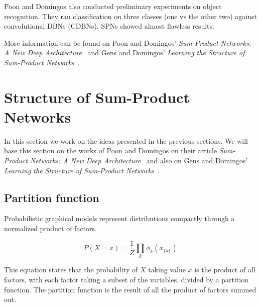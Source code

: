 \documentclass[a4paper,10pt]{article}
\theoremstyle{plain}
\begin{document}
Poon and Domingos also conducted preliminary experiments on object recognition. They ran
classification on three classes (one vs the other two) against convolutional DBNs (CDBNs). SPNs
showed almost flawless results.

\begin{table}[h]
\end{table}

More information can be found on Poon and Domingos' \textit{Sum-Product Networks: A New Deep
Architecture}~\cite{poon-domingos} and Gens and Domingos' \textit{Learning the Structure of
Sum-Product Networks}~\cite{gens-domingos}.

\newpage

\section{Structure of Sum-Product Networks}

In this section we work on the ideas presented in the previous sections. We will base this section
on the works of Poon and Domingos on their article \textit{Sum-Product Networks: A New Deep
Architecture}~\cite{poon-domingos} and also on Gens and Domingos' \textit{Learning the Structure of
Sum-Product Networks}~\cite{gens-domingos}.

\subsection{Partition function}

Probabilistic graphical models represent distributions compactly through a normalized product of
factors.

\begin{equation*}
  P(X=x) = \frac{1}{Z}\prod_k \phi_k (x_{\{k\}})
\end{equation*}

This equation states that the probability of $X$ taking value $x$ is the product of all factors,
with each factor taking a subset of the variables, divided by a partition function. The partition
function is the result of all the product of factors summed out.
\end{document}
